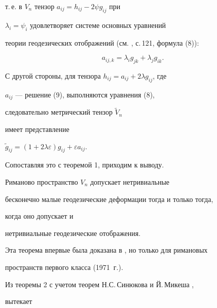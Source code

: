 т.\,е. в $V_n$ тензор $a_{ij}=h_{ij}-2\psi g_{ij}$ при 


$\lambda_i=\psi_i$ удовлетворяет системе основных уравнений


теории геодезических отображений (см. \cite{si}, с.\,121, формула (8)): 


\begin{equation}


a_{ij,k}=\lambda_ig_{jk}+\lambda_jg_{ik}.


\end{equation}





С другой стороны, для тензора $h_{ij}=a_{ij}+2\lambda g_{ij}$, где


$a_{ij}$ --- решение (9), выполняются уравнения (8),


следовательно метрический тензор $\widetilde{V}_n$ 


имеет представление


$\widetilde{g}_{ij}=(1+2\lambda \varepsilon )g_{ij}+\varepsilon


a_{ij}$. 





Сопоставляя это с теоремой 1, приходим к выводу.





\begin{thm}


Риманово пространство $V_n$ допускает нетривиальные


бесконечно малые геодезические деформации тогда и только тогда,


когда оно допускает и


нетривиальные геодезические отображения.


\end{thm}





Эта теорема впервые была доказана в \cite{siga}, но только для римановых


пространств первого класса (1971~г.).





Из теоремы 2 с учетом теорем Н.С.\,Синюкова и Й.\,Микеша \cite{si},


\cite{mige} вытекает





